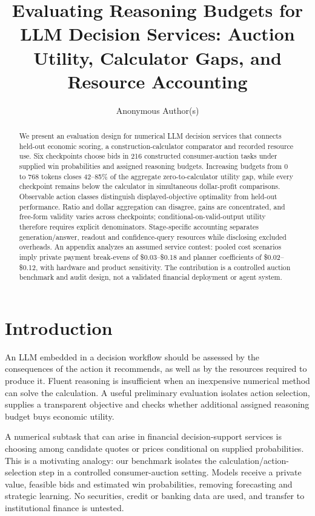 \documentclass[sigconf,anonymous,nonacm]{acmart}
\title[Reasoning Budgets for LLM Decision Services]{Evaluating Reasoning Budgets for LLM Decision Services: Auction Utility, Calculator Gaps, and Resource Accounting}
\author{Anonymous Author(s)}
\begin{document}
\begin{abstract}
We present an evaluation design for numerical LLM decision services that connects held-out economic scoring, a construction-calculator comparator and recorded resource use. Six checkpoints choose bids in 216 constructed consumer-auction tasks under supplied win probabilities and assigned reasoning budgets. Increasing budgets from 0 to 768 tokens closes 42--85\% of the aggregate zero-to-calculator utility gap, while every checkpoint remains below the calculator in simultaneous dollar-profit comparisons. Observable action classes distinguish displayed-objective optimality from held-out performance. Ratio and dollar aggregation can disagree, gains are concentrated, and free-form validity varies across checkpoints; conditional-on-valid-output utility therefore requires explicit denominators. Stage-specific accounting separates generation/answer, readout and confidence-query resources while disclosing excluded overheads. An appendix analyzes an assumed service contest: pooled cost scenarios imply private payment break-evens of \$0.03--\$0.18 and planner coefficients of \$0.02--\$0.12, with hardware and product sensitivity. The contribution is a controlled auction benchmark and audit design, not a validated financial deployment or agent system.
\end{abstract}
\maketitle
\section{Introduction}
An LLM embedded in a decision workflow should be assessed by the consequences of the action it recommends, as well as by the resources required to produce it. Fluent reasoning is insufficient when an inexpensive numerical method can solve the calculation. A useful preliminary evaluation isolates action selection, supplies a transparent objective and checks whether additional assigned reasoning budget buys economic utility.

A numerical subtask that can arise in financial decision-support services is choosing among candidate quotes or prices conditional on supplied probabilities. This is a motivating analogy: our benchmark isolates the calculation/action-selection step in a controlled consumer-auction setting. Models receive a private value, feasible bids and estimated win probabilities, removing forecasting and strategic learning. No securities, credit or banking data are used, and transfer to institutional finance is untested.
\end{document}

